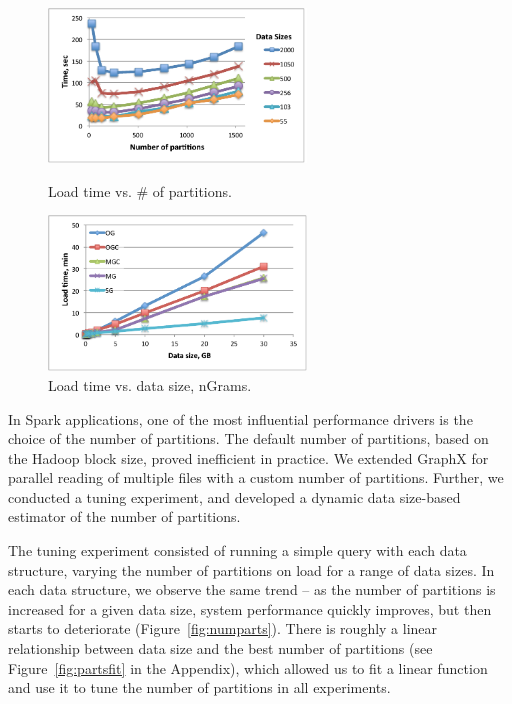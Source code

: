 \begin{figure}[th!]
\centering
\begin{minipage}{3in}
  \centering
  \includegraphics[width=2.7in]{figs/numparts.pdf}
\vspace{-0.1in}
  \caption{Load time vs. \# of partitions.}
  \label{fig:numparts}
\vspace{-0.1in}
\end{minipage}
\begin{minipage}{3in}
  \centering
  \includegraphics[width=2.7in]{figs/tselect.pdf}
\vspace{-0.1in}
  \caption{Load time vs. data size, nGrams.}
  \label{fig:tselect}
\vspace{-0.1in}
\end{minipage}
\end{figure}

In Spark applications, one of the most influential performance drivers
is the choice of the number of partitions.  The default number of
partitions, based on the Hadoop block size, proved inefficient in
practice.  We extended GraphX for parallel reading of multiple files
with a custom number of partitions.  Further, we conducted a tuning
experiment, and developed a dynamic data size-based estimator of the
number of partitions.

The tuning experiment consisted of running a simple 
query with each data structure, varying the number of partitions on
load for a range of data sizes.  In each data structure, we observe
the same trend -- as the number of partitions is increased for a given
data size, system performance quickly improves, but then starts to
deteriorate (Figure~\ref{fig:numparts}).  There is roughly a linear
relationship between data size and the best number of partitions (see
Figure~\ref{fig:partsfit} in the Appendix), which allowed us to fit a
linear function and use it to tune the number of partitions in all
experiments.

